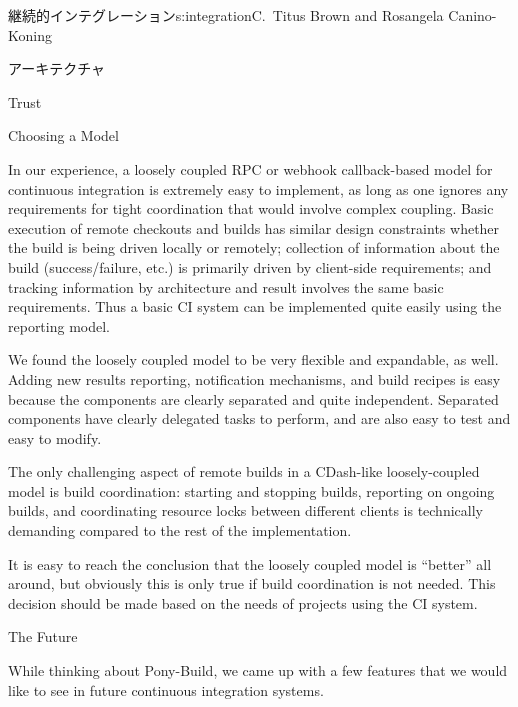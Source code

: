\begin{aosachapter}{継続的インテグレーション}{s:integration}{C.\ Titus Brown and Rosangela Canino-Koning}
\begin{aosasect1}{アーキテクチャ}
\begin{aosasect2}{Trust}
\end{aosasect2}

\begin{aosasect2}{Choosing a Model}

In our experience, a loosely coupled RPC or webhook callback-based
model for continuous integration is extremely easy to implement, as
long as one ignores any requirements for tight coordination that would
involve complex coupling. Basic execution of remote checkouts and
builds has similar design constraints whether the build is being
driven locally or remotely; collection of information about the build
(success/failure, etc.) is primarily driven by client-side
requirements; and tracking information by architecture and result
involves the same basic requirements.  Thus a basic CI system can be
implemented quite easily using the reporting model.

We found the loosely coupled model to be very flexible and expandable,
as well. Adding new results reporting, notification mechanisms, and
build recipes is easy because the components are clearly separated and
quite independent. Separated components have clearly delegated tasks
to perform, and are also easy to test and easy to modify.

The only challenging aspect of remote builds in a CDash-like
loosely-coupled model is build coordination: starting and stopping
builds, reporting on ongoing builds, and coordinating resource locks
between different clients is technically demanding compared to the
rest of the implementation.

It is easy to reach the conclusion that the loosely coupled model is
``better'' all around, but obviously this is only true if build
coordination is not needed.  This decision should be made based on the
needs of projects using the CI system.

\end{aosasect2}

\end{aosasect1}

\begin{aosasect1}{The Future}

While thinking about Pony-Build, we came up with a few features that
we would like to see in future continuous integration systems.

\begin{aosadescription}


\end{aosadescription}
\end{aosasect1}
\end{aosachapter}
